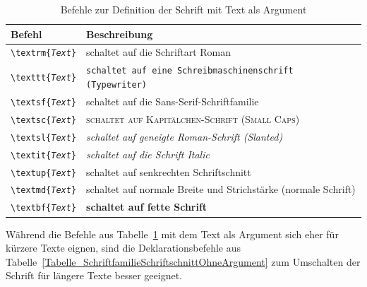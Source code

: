 \documentclass[a4paper,10pt,twoside]{scrbook}
\begin{document}
\begin{table}[h!tb]
\centering
\caption{Befehle zur Definition der Schrift mit Text als Argument}
\label{Tabelle_SchriftfamilieSchriftschnittMitArgument}       %
\begin{tabular}{ll}
\hline
Befehl & Beschreibung \\
\hline
\texttt{\textbackslash textrm\{\textsl{Text}\}} & \textrm{schaltet auf die Schriftart Roman} \\
\texttt{\textbackslash texttt\{\textsl{Text}\}} & \texttt{schaltet auf eine Schreibmaschinenschrift (Typewriter)} \\
\texttt{\textbackslash textsf\{\textsl{Text}\}} & \textsf{schaltet auf die Sans-Serif-Schriftfamilie} \\
\texttt{\textbackslash textsc\{\textsl{Text}\}} & \textsc{schaltet auf Kapitälchen-Schrift (Small Caps)} \\
\texttt{\textbackslash textsl\{\textsl{Text}\}} & \textsl{schaltet auf geneigte Roman-Schrift (Slanted)} \\
\texttt{\textbackslash textit\{\textsl{Text}\}} & \textit{schaltet auf die Schrift Italic} \\
\texttt{\textbackslash textup\{\textsl{Text}\}} & \textup{schaltet auf senkrechten Schriftschnitt} \\
\texttt{\textbackslash textmd\{\textsl{Text}\}} & \textmd{schaltet auf normale Breite und Strichstärke (normale Schrift)} \\
\texttt{\textbackslash textbf\{\textsl{Text}\}} & \textbf{schaltet auf fette Schrift} \\
\hline
\end{tabular}
\end{table}

Während die Befehle aus Tabelle~\ref{Tabelle_SchriftfamilieSchriftschnittMitArgument} mit dem Text als Argument sich eher für kürzere Texte eignen, sind die Deklarationsbefehle aus Tabelle~\ref{Tabelle_SchriftfamilieSchriftschnittOhneArgument} zum Umschalten der Schrift für längere Texte besser geeignet.
\end{document}

